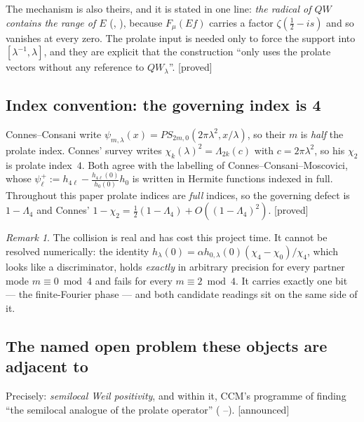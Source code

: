 \documentclass[11pt,a4paper]{article}
\theoremstyle{plain}
\theoremstyle{definition}
\theoremstyle{remark}
\newtheorem{remark}[theorem]{Remark}
\newcommand{\st}[1]{{\normalfont\sffamily\footnotesize[#1]}}
\newcommand{\proved}{\st{proved}}
\newcommand{\announced}{\st{announced}}
\newcommand{\R}{\mathbb{R}}
\newcommand{\Z}{\mathbb{Z}}
\newcommand{\Q}{\mathbb{Q}}
\newcommand{\A}{\mathbb{A}}
\newcommand{\E}{\mathcal{E}}
\newcommand{\F}{\mathcal{F}}
\newcommand{\PS}{\mathit{PS}}
\newcommand{\QW}{QW}
\newcommand{\file}[1]{\path{#1}}
\def\QW{QW}\def\E{E}\def\F{F}\def\R{R}\def\Q{Q}\def\Z{Z}\def\A{A}%
\begin{document}
The mechanism is also theirs, and it is stated in one line: \emph{the radical of
$\QW$ contains the range of $\E$} (\file{:181}, \file{:699}), because
$\F_\mu(\E f)$ carries a factor $\zeta(\tfrac12-is)$ and so vanishes at every
zero.  The prolate input is needed only to force the support into
$[\lambda^{-1},\lambda]$, and they are explicit that the construction ``only
uses the prolate vectors without any reference to $\QW_\lambda$''. \proved

\subsection{Index convention: the governing index is 4}
\label{sec:convention}

Connes--Consani write $\psi_{m,\lambda}(x)=\PS_{2m,0}(2\pi\lambda^2,x/\lambda)$,
so their $m$ is \emph{half} the prolate index.  Connes' survey writes
$\chi_k(\lambda)^2=\Lambda_{2k}(c)$ with $c=2\pi\lambda^2$, so his $\chi_2$ is
prolate index~$4$.  Both agree with the labelling of
Connes--Consani--Moscovici, whose $\psi^+_\ell:=h_{4\ell}-\frac{h_{4\ell}(0)}{h_0(0)}h_0$
is written in Hermite functions indexed in full.  Throughout this paper prolate
indices are \emph{full} indices, so the governing defect is $1-\Lambda_4$ and
Connes' $1-\chi_2=\tfrac12(1-\Lambda_4)+O((1-\Lambda_4)^2)$. \proved

\begin{remark}
The collision is real and has cost this project time.  It cannot be resolved
numerically: the identity
$h_\lambda(0)=\alpha h_{0,\lambda}(0)(\chi_4-\chi_0)/\chi_4$, which looks like a
discriminator, holds \emph{exactly} in arbitrary precision for every partner mode
$m\equiv0\bmod4$ and fails for every $m\equiv2\bmod4$.  It carries exactly one
bit --- the finite-Fourier phase --- and both candidate readings sit on the same
side of it.
\end{remark}

\subsection{The named open problem these objects are adjacent to}
\label{sec:adjacent}

Precisely: \emph{semilocal Weil positivity}, and within it, CCM's programme of
finding ``the semilocal analogue of the prolate operator''
(\cite{CCM2023} \file{mainc2m24fine.tex:197}--\file{:198}). \announced
\end{document}
